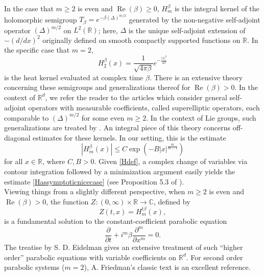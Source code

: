 \documentclass{article}
\theoremstyle{theorem}
\theoremstyle{remark}
\renewcommand\Re{\operatorname{Re}}%
\begin{document}
\noindent In the case that $m\geq 2$ is even and $\Re(\beta)\geq 0$,  $H_m^{\beta}$ is 
the integral kernel of the holomorphic semigroup $T_\beta= e^{-\beta (\Delta)^{m/2}}$ generated by the non-negative self-adjoint operator $(\Delta)^{m/2}$ on $L^2(\mathbb{R})$; here, $\Delta$ is the unique self-adjoint extension of $-(d/dx)^2$ originally defined on smooth compactly supported functions on $\mathbb{R}$. In the specific case that $m=2$,
\begin{equation}\label{heatker}
 H_2^{\beta}(x)=\frac{1}{\sqrt{4\pi \beta}}e^{-\frac{|x|^2}{4\beta}}
\end{equation}
is the heat kernel evaluated at complex time $\beta$. There is an extensive theory concerning these semigroups and generalizations thereof for $\Re(\beta)>0$. In the context of $\mathbb{R}^d$,  we refer the reader to the articles \cite{Davies1995,BarbatisDavies1995} which consider general self-adjoint operators with measurable coefficients, called superelliptic operators, each comparable to $(\Delta)^{m/2}$ for some even $m\geq 2$. In the context of Lie groups, such generalizations are treated by \cite{Robinsonbook,Robinson1991, Dungey2002}. An integral piece of this theory concerns off-diagonal estimates for these kernels. In our setting, this is the estimate \begin{equation}\label{Hassymptoticnicecase}
|H_m^{\beta}(x)|\leq C\exp(-B|x|^{\frac{m}{m-1}})
\end{equation}
for all $x\in\mathbb{R}$, where $C,B>0$. Given \eqref{Hdef}, a complex change of variables via contour integration followed by a minimization argument easily yields the estimate \eqref{Hassymptoticnicecase} (see Proposition 5.3 of \cite{Robinsonbook}).\\

\noindent Viewing things from a slightly different perspective, when $m\geq 2$ is even and $\Re(\beta)>0$, the function $Z:(0,\infty)\times\mathbb{R}\rightarrow\mathbb{C}$, defined by
\begin{equation*}
Z(t,x)=H_m^{t\beta}(x),
\end{equation*}
is a fundamental solution to the constant-coefficient parabolic equation   
\begin{equation*}
\frac{\partial}{\partial t}+i^m\beta\frac{\partial^m}{\partial x^m}=0.
\end{equation*}
The treatise \cite{Eidelmanbook1969} by S. D. Eidelman gives an extensive treatment of such ``higher order'' parabolic equations with variable coefficients on $\mathbb{R}^d$. For second order parabolic systems ($m=2$), A. Friedman's classic text \cite{Friedmanbook1964} is an excellent reference. 
\end{document}
